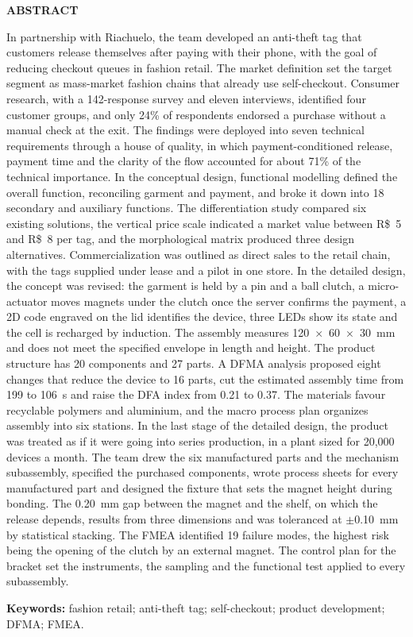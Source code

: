 \begin{center}
    \textbf{ABSTRACT}
\end{center}

\noindent In partnership with Riachuelo, the team developed an anti-theft tag that customers release themselves after paying with their phone, with the goal of reducing checkout queues in fashion retail. The market definition set the target segment as mass-market fashion chains that already use self-checkout. Consumer research, with a 142-response survey and eleven interviews, identified four customer groups, and only 24\% of respondents endorsed a purchase without a manual check at the exit. The findings were deployed into seven technical requirements through a house of quality, in which payment-conditioned release, payment time and the clarity of the flow accounted for about 71\% of the technical importance. In the conceptual design, functional modelling defined the overall function, reconciling garment and payment, and broke it down into 18 secondary and auxiliary functions. The differentiation study compared six existing solutions, the vertical price scale indicated a market value between R\$~5 and R\$~8 per tag, and the morphological matrix produced three design alternatives. Commercialization was outlined as direct sales to the retail chain, with the tags supplied under lease and a pilot in one store. In the detailed design, the concept was revised: the garment is held by a pin and a ball clutch, a micro-actuator moves magnets under the clutch once the server confirms the payment, a 2D code engraved on the lid identifies the device, three LEDs show its state and the cell is recharged by induction. The assembly measures 120~$\times$~60~$\times$~30~mm and does not meet the specified envelope in length and height. The product structure has 20 components and 27 parts. A DFMA analysis proposed eight changes that reduce the device to 16 parts, cut the estimated assembly time from 199 to 106~s and raise the DFA index from 0.21 to 0.37. The materials favour recyclable polymers and aluminium, and the macro process plan organizes assembly into six stations. In the last stage of the detailed design, the product was treated as if it were going into series production, in a plant sized for 20,000 devices a month. The team drew the six manufactured parts and the mechanism subassembly, specified the purchased components, wrote process sheets for every manufactured part and designed the fixture that sets the magnet height during bonding. The 0.20~mm gap between the magnet and the shelf, on which the release depends, results from three dimensions and was toleranced at $\pm$0.10~mm by statistical stacking. The FMEA identified 19 failure modes, the highest risk being the opening of the clutch by an external magnet. The control plan for the bracket set the instruments, the sampling and the functional test applied to every subassembly.

\vspace{1em}
\noindent\textbf{Keywords:} fashion retail; anti-theft tag; self-checkout; product development; DFMA; FMEA.
